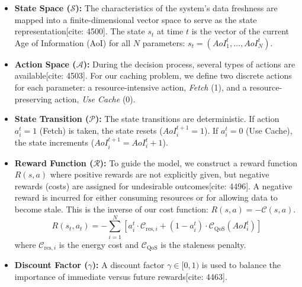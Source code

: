 \documentclass[journal]{IEEEtran}
\begin{document}
\begin{itemize}
    \item \textbf{State Space ($\mathcal{S}$):} The characteristics of the system's data freshness are mapped into a finite-dimensional vector space to serve as the state representation[cite: 4500]. The state $s_t$ at time $t$ is the vector of the current Age of Information (AoI) for all $N$ parameters: $s_t = (AoI_1^t, \dots, AoI_N^t)$.

    \item \textbf{Action Space ($\mathcal{A}$):} During the decision process, several types of actions are available[cite: 4503]. For our caching problem, we define two discrete actions for each parameter: a resource-intensive action, \textit{Fetch} (1), and a resource-preserving action, \textit{Use Cache} (0).

    \item \textbf{State Transition ($\mathcal{P}$):} The state transitions are deterministic. If action $a_i^t = 1$ (Fetch) is taken, the state resets ($AoI_i^{t+1} = 1$). If $a_i^t = 0$ (Use Cache), the state increments ($AoI_i^{t+1} = AoI_i^t + 1$).

    \item \textbf{Reward Function ($\mathcal{R}$):} To guide the model, we construct a reward function $R(s,a)$ where positive rewards are not explicitly given, but negative rewards (costs) are assigned for undesirable outcomes[cite: 4496]. A negative reward is incurred for either consuming resources or for allowing data to become stale. This is the inverse of our cost function: $R(s,a) = - \mathcal{C}(s,a)$.
    \begin{equation}
        R(s_t, a_t) = - \sum_{i=1}^{N} \left[ a_i^t \cdot \mathcal{C}_{\text{res}, i} + (1 - a_i^t) \cdot \mathcal{C}_{\text{QoS}}(AoI_i^t) \right]
    \end{equation}
    where $\mathcal{C}_{\text{res}, i}$ is the energy cost and $\mathcal{C}_{\text{QoS}}$ is the staleness penalty.

    \item \textbf{Discount Factor ($\gamma$):} A discount factor $\gamma \in [0, 1)$ is used to balance the importance of immediate versus future rewards[cite: 4463].
\end{itemize}
\end{document}
